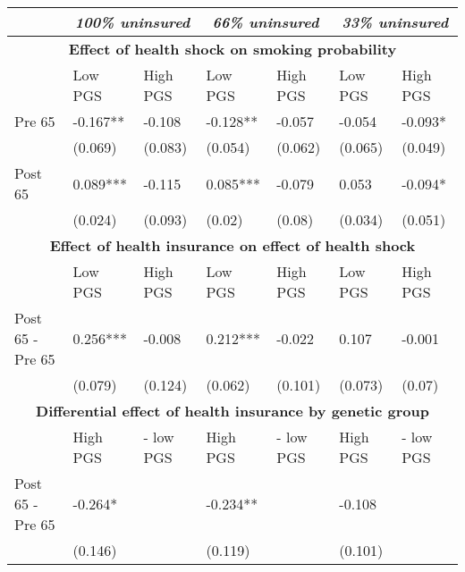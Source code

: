 % 
\begin{tabular}{ l | p{2cm}p{2cm}| p{2cm}p{2cm}| p{2cm}p{2cm}}
  & \multicolumn{2}{c}{ \textit{100\% uninsured}} & \multicolumn{2}{c}{ \textit{66\% uninsured}} & \multicolumn{2}{c}{ \textit{33\% uninsured}} \\
 \toprule
  \multicolumn{7}{c}{ \textbf{Effect of health shock on smoking probability}} \\
 \midrule
 & Low PGS & High PGS & Low PGS & High PGS & Low PGS & High PGS \\ 
   \midrule
Pre 65 & -0.167** & -0.108 & -0.128** & -0.057 & -0.054 & -0.093* \\ 
   & (0.069) & (0.083) & (0.054) & (0.062) & (0.065) & (0.049) \\ 
  Post 65 & 0.089*** & -0.115 & 0.085*** & -0.079 & 0.053 & -0.094* \\ 
   & (0.024) & (0.093) & (0.02) & (0.08) & (0.034) & (0.051) \\ 
   \toprule \multicolumn{7}{c}{ \textbf{Effect of health insurance on effect of health shock}} \\
 \midrule
 & Low PGS & High PGS & Low PGS & High PGS & Low PGS & High PGS \\ 
   \midrule
Post 65 - Pre 65 & 0.256*** & -0.008 & 0.212*** & -0.022 & 0.107 & -0.001 \\ 
   & (0.079) & (0.124) & (0.062) & (0.101) & (0.073) & (0.07) \\ 
   \toprule \multicolumn{7}{c}{ \textbf{Differential effect of health insurance by genetic group}} \\
 \midrule
 & High PGS  & - low PGS & High PGS  & - low PGS & High PGS  & - low PGS \\ 
   \midrule
Post 65 - Pre 65 & -0.264* &  & -0.234** &  & -0.108 &  \\ 
   & (0.146) &  & (0.119) &  & (0.101) &  \\ 
  \end{tabular}
